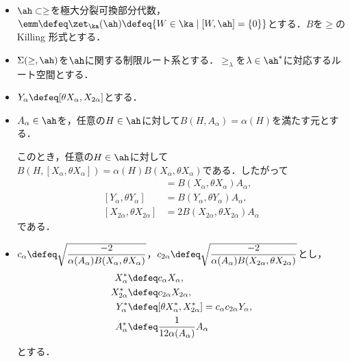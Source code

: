 \begin{nttdef}\label{nttdef:su21-red}
  \leavevmode
  \vspace{-1em}
  \begin{itemize}
  \item $\ah \subset \ge$を極大分裂可換部分代数，$\emm \defeq \zet_{\ka}(\ah) \defeq \{W\in \ka\mid [W,\ah] = \{0\} \} $とする．$B$を$\ge$のKilling 形式とする．
  \item $\Sigma(\ge,\ah) $を$\ah$に関する制限ルート系とする．$\ge_{\lambda} $を$\lambda\in \ah^{*}$に対応するルート空間とする．
  \item $Y_{\alpha}\defeq [\theta X_{\alpha}, X_{2\alpha}] $とする．
  \item $A_{\alpha}\in \ah $を，任意の$H\in \ah$に対して$B(H,A_{\alpha}) = \alpha(H) $を満たす元とする．
    
    このとき，任意の$H\in \ah$に対して$B(H, [X_{\alpha}, \theta X_{\alpha}]) = \alpha(H) B(X_{\alpha}, \theta X_{\alpha}) $である．したがって
      \begin{align*}
        [X_{\alpha}, \theta X_{\alpha}] &= B(X_{\alpha}, \theta X_{\alpha})A_{\alpha} ,\\
        [Y_{\alpha}, \theta Y_{\alpha}] &= B(Y_{\alpha}, \theta Y_{\alpha})A_{\alpha}, \\
        [X_{2\alpha}, \theta X_{2\alpha}] &= 2B(X_{2\alpha}, \theta X_{2\alpha})A_{\alpha} 
      \end{align*}
    である．
    \item $c_{\alpha}\defeq \sqrt{\dfrac{-2}{\alpha(A_{\alpha})B(X_{\alpha}, \theta X_{\alpha})}} $，$ c_{2\alpha}  \defeq \sqrt{\dfrac{-2}{\alpha(A_{\alpha})B(X_{2\alpha}, \theta X_{2\alpha})}} $とし，
      \begin{align*}
        X_{\alpha}^{*} &\defeq c_{\alpha}X_{\alpha}, \\
        X_{2\alpha}^{*} &\defeq c_{2\alpha}X_{2\alpha},\\ 
        Y_{\alpha}^{*} &\defeq [\theta X_{\alpha}^{*}, X_{2\alpha}^{*} ] = c_{\alpha}c_{2\alpha}Y_{\alpha} ,\\
        A_{\alpha}^{*} &\defeq \dfrac{1}{12\alpha(A_{\alpha}) %
      }A_{\alpha} 
      \end{align*}
    とする．
  \end{itemize}
\end{nttdef}

